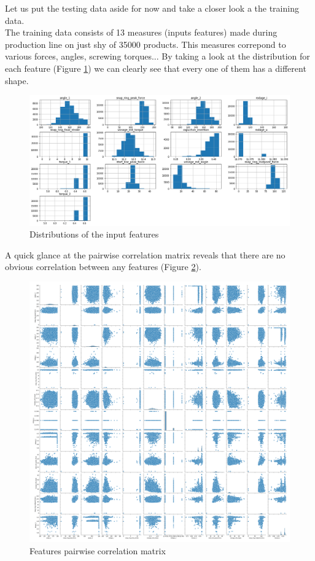 Let us put the testing data aside for now and take a closer look a the training data.\\

The training data consists of 13 measures (inputs features) made during production line on just shy of 35000 products. This measures correpond to various forces, angles, screwing torques... By taking a look at the distribution for each feature (Figure \ref{distrib}) we can clearly see that every one of them has a different shape.\\

\begin{figure}
    \center
    \includegraphics[scale=.38]{img/features_distributions.png}
    \caption{Distributions of the input features}
    \label{distrib}
\end{figure}

A quick glance at the pairwise correlation matrix reveals that there are no obvious correlation between any features (Figure \ref{corr}).

\begin{figure}
    \center
    \includegraphics[scale=.15]{img/correlation_matrix.png}
    \caption{Features pairwise correlation matrix}
    \label{corr}
\end{figure}

